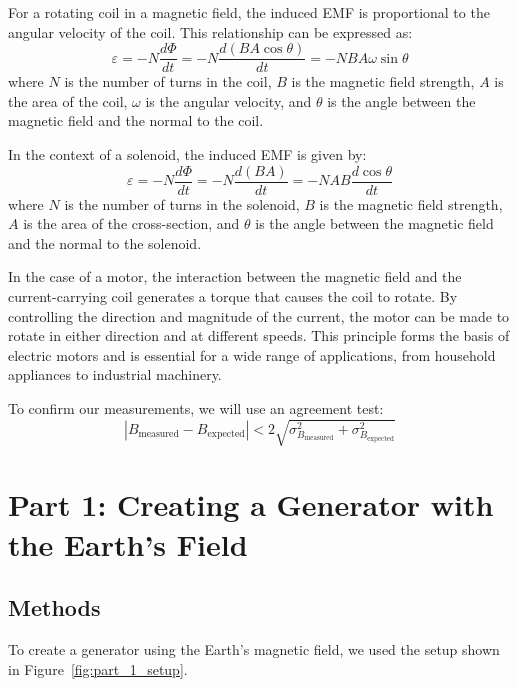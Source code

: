 \documentclass[11pt]{article}
\let\oldsection\section
\renewcommand\section{\clearpage\oldsection}
\begin{document}
    For a rotating coil in a magnetic field, the induced EMF is proportional to the angular velocity of the coil.
    This relationship can be expressed as:
    \begin{equation}
        \varepsilon = -N\frac{d\Phi}{dt} = -N\frac{d(BA\cos\theta)}{dt} = -NBA\omega\sin\theta
        \label{eq:rotating_coil}
    \end{equation}
    where $N$ is the number of turns in the coil, $B$ is the magnetic field strength, $A$ is the area of the coil, $\omega$ is the angular velocity, and $\theta$ is the angle between the magnetic field and the normal to the coil.

    In the context of a solenoid, the induced EMF is given by:
    \begin{equation}
        \varepsilon = -N\frac{d\Phi}{dt} = -N\frac{d(BA)}{dt} = -NAB\frac{d\cos\theta}{dt}
        \label{eq:solenoid}
    \end{equation}
    where $N$ is the number of turns in the solenoid, $B$ is the magnetic field strength, $A$ is the area of the cross-section, and $\theta$ is the angle between the magnetic field and the normal to the solenoid.

    In the case of a motor, the interaction between the magnetic field and the current-carrying coil generates a torque that causes the coil to rotate.
    By controlling the direction and magnitude of the current, the motor can be made to rotate in either direction and at different speeds.
    This principle forms the basis of electric motors and is essential for a wide range of applications, from household appliances to industrial machinery.

    To confirm our measurements, we will use an agreement test:
    \begin{equation}
        |B_{\text{measured}} - B_{\text{expected}}| < 2 \sqrt{\sigma_{B_{\text{measured}}}^2 + \sigma_{B_{\text{expected}}}^2}
        \label{eq:agreement}
    \end{equation}


    \section{Part 1: Creating a Generator with the Earth’s Field}\label{sec:part_1}

    \subsection{Methods}\label{subsec:part_1_methods}
    To create a generator using the Earth's magnetic field, we used the setup shown in Figure~\ref{fig:part_1_setup}.
\end{document}
